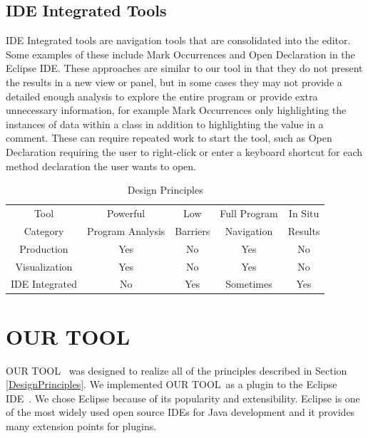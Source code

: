 \documentclass[conference]{IEEEtran}
\newcommand{\toolName}{OUR TOOL}
\begin{document}
\subsection{IDE Integrated Tools}
IDE Integrated tools are navigation tools that are consolidated into the editor. Some examples of these include Mark Occurrences and Open Declaration in the Eclipse IDE. These approaches are similar to our tool in that they do not present the results in a new view or panel, but in some cases they may not provide a detailed enough analysis to explore the entire program or provide extra unnecessary information, for example Mark Occurrences only highlighting the instances of data within a class in addition to highlighting the value in a comment. These can require repeated work to start the tool, such as Open Declaration requiring the user to right-click or enter a keyboard shortcut for each method declaration the user wants to open.

\begin{table}
	\centering
	\caption{Design Principles}
	\begin{tabular}{|c|c|c|c|c|}
		\hline
		Tool & Powerful & Low & Full Program & In Situ\\
		Category & Program Analysis & Barriers & Navigation & Results\\
		\hline
		Production & Yes & No & Yes & No\\
		\hline
		Visualization & Yes & No & Yes & No \\
		\hline
		IDE Integrated & No & Yes & Sometimes & Yes \\
		\hline
	\end{tabular}
	\label{table:background}
\end{table}



\section{\toolName}
\toolName~ was designed to realize all of the principles described in Section \ref{DesignPrinciples}. 
We implemented \toolName~as a plugin to the Eclipse IDE~\cite{Eclipse}. 
We chose Eclipse because of its popularity and extensibility. 
Eclipse is one of the most widely used open source IDEs for Java development and it provides many extension points for plugins. 
\end{document}
